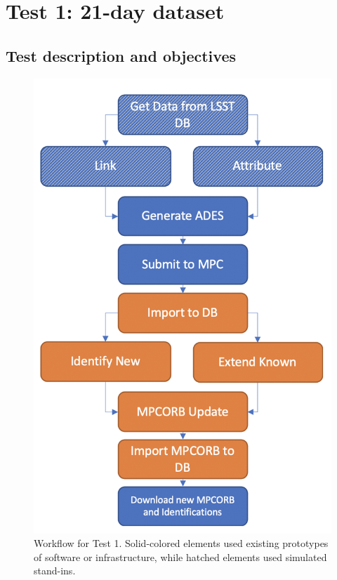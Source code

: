 \section{Test 1: 21-day dataset}

\subsection{Test description and objectives}

\begin{figure}
	\centering
	\includegraphics[width=0.9\columnwidth]{test1-workflow.png}
	\caption{Workflow for Test 1. Solid-colored elements used existing prototypes of software or infrastructure, while hatched elements used simulated stand-ins.}
	\label{fig:test1}
\end{figure}

